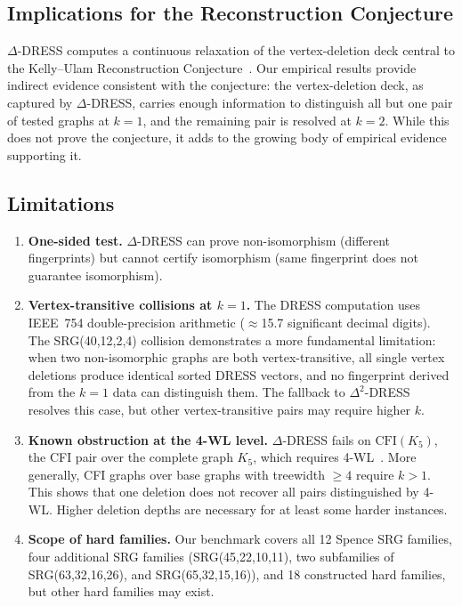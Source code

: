 \documentclass[11pt,a4paper]{article}
\begin{document}
\subsection{Implications for the Reconstruction Conjecture}

$\Delta$-DRESS computes a continuous relaxation of the vertex-deletion deck central to the Kelly--Ulam Reconstruction Conjecture~\cite{kelly1942congruence, ulam1960collection}.
Our empirical results provide indirect evidence consistent with the conjecture: the vertex-deletion deck, as captured by $\Delta$-DRESS, carries enough information to distinguish all but one pair of tested graphs at $k = 1$, and the remaining pair is resolved at $k = 2$.
While this does not prove the conjecture, it adds to the growing body of empirical evidence supporting it.


\subsection{Limitations}

\begin{enumerate}
    \item \textbf{One-sided test.}
    $\Delta$-DRESS can prove non-isomorphism (different fingerprints) but cannot certify isomorphism (same fingerprint does not guarantee isomorphism).

    \item \textbf{Vertex-transitive collisions at $k = 1$.}
    The DRESS computation uses IEEE~754 double-precision arithmetic ($\approx$15.7 significant decimal digits).
    The SRG(40,12,2,4) collision demonstrates a more fundamental limitation: when two non-isomorphic graphs are both vertex-transitive, all single vertex deletions produce identical sorted DRESS vectors, and no fingerprint derived from the $k = 1$ data can distinguish them.
    The fallback to $\Delta^2$-DRESS resolves this case, but other vertex-transitive pairs may require higher $k$.

    \item \textbf{Known obstruction at the 4-WL level.}
    $\Delta$-DRESS fails on $\text{CFI}(K_5)$, the CFI pair over the complete graph $K_5$, which requires 4-WL~\cite{cai1992optimal, castrillo2026dress}.
    More generally, CFI graphs over base graphs with treewidth $\geq 4$ require $k > 1$.
    This shows that one deletion does not recover all pairs distinguished by 4-WL. Higher deletion depths are necessary for at least some harder instances.

    \item \textbf{Scope of hard families.}
    Our benchmark covers all 12 Spence SRG families, four additional SRG families (SRG(45,22,10,11), two subfamilies of SRG(63,32,16,26), and SRG(65,32,15,16)), and 18 constructed hard families, but other hard families may exist.
\end{enumerate}
\end{document}
